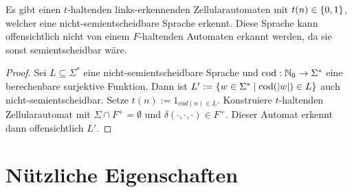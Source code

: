 \begin{proposition}
    Es gibt einen $t$-haltenden links-erkennenden Zellularautomaten mit
    $t(n) \in \{ {0, 1} \}$,
    welcher eine nicht-semientscheidbare Sprache erkennt.
    Diese Sprache kann offensichtlich nicht
    von einem $F$-haltenden Automaten erkannt werden,
    da sie sonst semientscheidbar wäre.
\end{proposition}
\begin{proof}
    Sei $L \subseteq \Sigma^*$ eine nicht-semientscheidbare Sprache und $\mathrm{cod}: \mathbb{N}_0 \to \Sigma^*$ eine berechenbare surjektive Funktion.
    Dann ist $L' := \{ { w \in \Sigma^* } \; | \; { \mathrm{cod}(|w|) \in L } \}$ auch nicht-semientscheidbar.
    Setze $t(n) := 1_{cod(n) \in L}$.
    Konstruiere $t$-haltenden Zellularautomat mit $\Sigma \cap F^+ = \emptyset$ und $\delta(\cdot, \cdot, \cdot) \in F^+$.
    Dieser Automat erkennt dann offensichtlich $L'$.
\end{proof}

\begin{comment}
    \begin{proposition}
        Sei $C$ ein $F$-haltender links-erkennender Zellularautomat und $n_0 \in \N$ so, dass $\cworsttime_C(n_0) < n_0$.
        Dann $\forall n \geq n_0: \cworsttime_C(n) = \cworsttime_C(n_0)$.
    \end{proposition}
    \begin{proof}
        Bei der Eingabe eines Wortes $w$ der Länge $n_0$ merkt $C$ nicht mehr, wenn $w$ verlängert wird.
        Ausführlicherer Beweis folgt.
    \end{proof}
\end{comment}

\section{Nützliche Eigenschaften}


